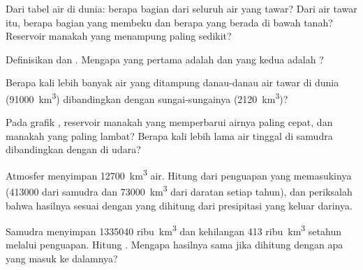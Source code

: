 \begin{exercise}[$\star$]\label{exo:g10:freshwater-resources:2}
Dari tabel air di dunia: berapa bagian dari seluruh air yang tawar? Dari air
tawar itu, berapa bagian yang membeku dan berapa yang berada di bawah tanah?
Reservoir manakah yang menampung paling sedikit?
\end{exercise}

\begin{exercise}[$\star$]\label{exo:g10:freshwater-resources:3}
Definisikan  dan . Mengapa yang pertama
adalah  dan yang kedua adalah ?
\end{exercise}

\begin{exercise}[$\star$]\label{exo:g10:freshwater-resources:4}
Berapa kali lebih banyak air yang ditampung danau-danau air tawar di dunia
(\num{91000}~\unit{km^3}) dibandingkan dengan sungai-sungainya
(\num{2120}~\unit{km^3})?
\end{exercise}

\begin{exercise}[$\star$]\label{exo:g10:freshwater-resources:5}
Pada grafik , reservoir manakah yang memperbarui airnya paling
cepat, dan manakah yang paling lambat? Berapa kali lebih lama air tinggal di
samudra dibandingkan dengan di udara?
\end{exercise}

\begin{exercise}[$\star\star$]\label{exo:g10:freshwater-resources:6}
Atmosfer menyimpan \num{12700}~\unit{km^3} air. Hitung  dari
penguapan yang memasukinya (\num{413000} dari samudra dan
\num{73000}~\unit{km^3} dari daratan setiap tahun), dan periksalah bahwa
hasilnya sesuai dengan  yang dihitung dari presipitasi yang
keluar darinya.
\end{exercise}

\begin{exercise}[$\star\star$]\label{exo:g10:freshwater-resources:7}
Samudra menyimpan \num{1335040} ribu~\unit{km^3} dan kehilangan
\num{413} ribu~\unit{km^3} setahun melalui penguapan. Hitung .
Mengapa hasilnya sama jika dihitung dengan apa yang masuk ke dalamnya?
\end{exercise}

